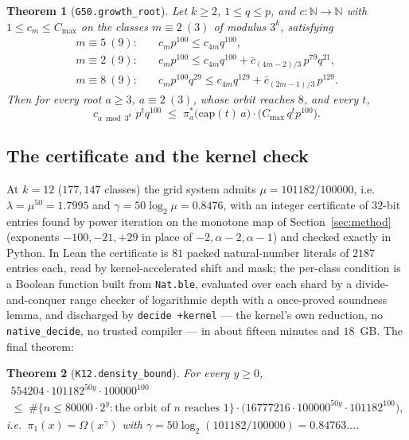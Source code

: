 \documentclass[11pt]{article}
\newtheorem{theorem}{Theorem}[section]
\newcommand{\N}{\mathbb{N}}
\newcommand{\code}[1]{\texttt{#1}}
\begin{document}
\begin{theorem}[\code{G50.growth\_root}]
Let $k \ge 2$, $1 \le q \le p$, and $c : \N \to \N$ with
$1 \le c_m \le C_{\max}$ on the classes $m \equiv 2\ (3)$ of modulus
$3^k$, satisfying
\begin{align*}
m \equiv 5\ (9):&\quad c_m p^{100} \le c_{4m} q^{100},\\
m \equiv 2\ (9):&\quad c_m p^{100} \le c_{4m} q^{100} + \bar c_{(4m-2)/3}\, p^{79} q^{21},\\
m \equiv 8\ (9):&\quad c_m p^{100} q^{29} \le c_{4m} q^{129} + \bar c_{(2m-1)/3}\, p^{129}.
\end{align*}
Then for every root $a \ge 3$, $a \equiv 2\ (3)$, whose orbit reaches
$8$, and every $t$,
\[
c_{a \bmod 3^k}\; p^t q^{100} \;\le\; \pi^*_a\big(\mathrm{cap}(t)\, a\big)\cdot
\big(C_{\max}\, q^t p^{100}\big).
\]
\end{theorem}

\subsection*{The certificate and the kernel check}

At $k = 12$ ($177{,}147$ classes) the grid system admits
$\mu = 101182/100000$, i.e.\ $\lambda = \mu^{50} = 1.7995$ and
$\gamma = 50 \log_2 \mu = 0.8476$, with an integer certificate of
$32$-bit entries found by power iteration on the monotone map of
Section~\ref{sec:method} (exponents $-100, -21, +29$ in place of
$-2, \alpha-2, \alpha-1$) and checked exactly in Python. In Lean the
certificate is $81$ packed natural-number literals of $2187$ entries
each, read by kernel-accelerated shift and mask; the per-class
condition is a Boolean function built from \code{Nat.ble}, evaluated
over each shard by a divide-and-conquer range checker of logarithmic
depth with a once-proved soundness lemma, and discharged by
\code{decide +kernel} --- the kernel's own reduction, no
\code{native\_decide}, no trusted compiler --- in about fifteen minutes
and $18$~GB. The final theorem:

\begin{theorem}[\code{K12.density\_bound}]
For every $y \ge 0$,
\begin{multline*}
554204 \cdot 101182^{50y} \cdot 100000^{100} \\
\le\; \#\{n \le 80000\cdot 2^y : \text{the orbit of } n \text{ reaches } 1\}
\cdot \big(16777216 \cdot 100000^{50y}\cdot 101182^{100}\big),
\end{multline*}
i.e.\ $\pi_1(x) = \Omega(x^{\gamma})$ with $\gamma = 50\log_2(101182/100000)
= 0.84763\ldots$.
\end{theorem}
\end{document}
